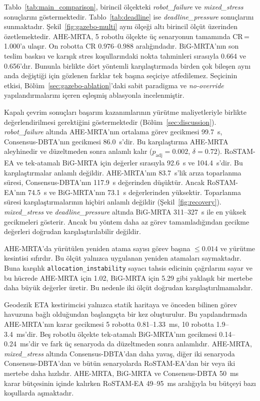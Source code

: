 \documentclass[10pt,letterpaper,onecolumn]{IEEEtran}
\begin{document}
Tablo~\ref{tab:main_comparison}, birincil ölçekteki \textit{robot\_failure}
ve \textit{mixed\_stress} sonuçlarını göstermektedir. Tablo~\ref{tab:deadline}
ise \textit{deadline\_pressure} sonuçlarını sunmaktadır.
Şekil~\ref{fig:gazebo-multi} aynı ölçeği altı birincil ölçüt üzerinden
özetlemektedir. AHE-MRTA, 5 robotlu ölçekte üç senaryonun tamamında
CR\,=\,1.000'a ulaşır. On robotta CR $0.976$--$0.988$ aralığındadır.
BiG-MRTA'nın son teslim baskısı ve karışık stres koşullarındaki nokta
tahminleri sırasıyla 0.664 ve 0.656'dır. Bununla birlikte dört yöntemli
karşılaştırmada birden çok bileşen aynı anda değiştiği için gözlenen farklar
tek başına seçiciye atfedilemez. Seçicinin etkisi,
Bölüm~\ref{sec:gazebo-ablation}'daki sabit paradigma ve \emph{no-override}
yapılandırmalarını içeren eşleşmiş ablasyonla incelenmiştir.

Kapalı çevrim sonuçları başarım kazanımlarının yürütme maliyetleriyle birlikte
değerlendirilmesi gerektiğini göstermektedir (Bölüm~\ref{sec:discussion}).
\textit{robot\_failure} altında AHE-MRTA'nın ortalama görev gecikmesi 99.7~s,
Consensus-DBTA'nın gecikmesi 86.0~s'dir. Bu karşılaştırma AHE-MRTA aleyhinedir
ve düzeltmeden sonra anlamlı kalır ($p_{\mathrm{adj}}{=}0.002$,
$\delta{=}0.72$). RoSTAM-EA ve tek-atamalı BiG-MRTA için değerler sırasıyla
92.6~s ve 104.4~s'dir. Bu karşılaştırmalar anlamlı değildir. AHE-MRTA'nın
83.7~s'lik arıza toparlanma süresi, Consensus-DBTA'nın 117.9~s değerinden
düşüktür. Ancak RoSTAM-EA'nın 74.5~s ve BiG-MRTA'nın 73.1~s değerlerinden
yüksektir.
Toparlanma süresi karşılaştırmalarının hiçbiri anlamlı değildir
(Şekil~\ref{fig:recovery}). \textit{mixed\_stress} ve
\textit{deadline\_pressure} altında BiG-MRTA 311--327~s ile en yüksek
gecikmeleri gösterir. Ancak bu yöntem daha az görev tamamladığından gecikme
değerleri doğrudan karşılaştırılabilir değildir.

AHE-MRTA'da yürütülen yeniden atama sayısı görev başına ${\leq}0.014$ ve
yürütme kesintisi sıfırdır. Bu ölçüt yalnızca uygulanan yeniden atamaları
saymaktadır. Buna karşılık \texttt{allocation\_instability} sayacı tahsis
edicinin çağrılarını sayar ve bu hücrede AHE-MRTA için 1.02, BiG-MRTA için
5.29 gibi yaklaşık bir mertebe daha büyük değerler üretir. Bu nedenle iki
ölçüt doğrudan karşılaştırılmamalıdır.

Geodezik ETA kestirimcisi yalnızca statik haritaya ve önceden bilinen görev
havuzuna bağlı olduğundan başlangıçta bir kez oluşturulur. Bu yapılandırmada
AHE-MRTA'nın karar gecikmesi 5 robotta 0.81--1.33~ms, 10 robotta
1.9--3.4~ms'dir. Beş robotlu ölçekte tek-atamalı BiG-MRTA'nın gecikmesi
0.14--0.24~ms'dir ve fark üç senaryoda da düzeltmeden sonra anlamlıdır.
AHE-MRTA, \textit{mixed\_stress} altında Consensus-DBTA'dan daha yavaş, diğer
iki senaryoda Consensus-DBTA'dan ve bütün senaryolarda RoSTAM-EA'dan bir veya
iki mertebe daha hızlıdır. AHE-MRTA, BiG-MRTA ve Consensus-DBTA 50~ms karar
bütçesinin içinde kalırken RoSTAM-EA 49--95~ms aralığıyla bu bütçeyi bazı
koşullarda aşmaktadır.
\end{document}
